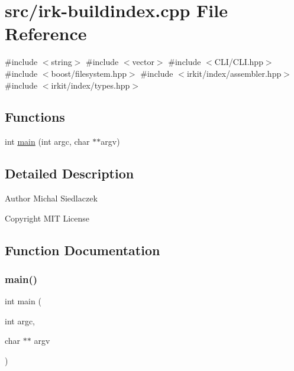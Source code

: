 \hypertarget{irk-buildindex_8cpp}{}\section{src/irk-\/buildindex.cpp File Reference}
\label{irk-buildindex_8cpp}
{\ttfamily \#include $<$string$>$}\newline
{\ttfamily \#include $<$vector$>$}\newline
{\ttfamily \#include $<$C\+L\+I/\+C\+L\+I.\+hpp$>$}\newline
{\ttfamily \#include $<$boost/filesystem.\+hpp$>$}\newline
{\ttfamily \#include $<$irkit/index/assembler.\+hpp$>$}\newline
{\ttfamily \#include $<$irkit/index/types.\+hpp$>$}\newline
\subsection*{Functions}
\begin{DoxyCompactItemize}
\item 
int \mbox{\hyperlink{irk-buildindex_8cpp_a3c04138a5bfe5d72780bb7e82a18e627}{main}} (int argc, char $\ast$$\ast$argv)
\end{DoxyCompactItemize}


\subsection{Detailed Description}
\begin{DoxyAuthor}{Author}
Michal Siedlaczek 
\end{DoxyAuthor}
\begin{DoxyCopyright}{Copyright}
M\+IT License 
\end{DoxyCopyright}


\subsection{Function Documentation}
\mbox{\label{irk-buildindex_8cpp_a3c04138a5bfe5d72780bb7e82a18e627}} 
\subsubsection{\texorpdfstring{main()}{main()}}
{\footnotesize\ttfamily int main (\begin{DoxyParamCaption}\item[{int}]{argc,  }\item[{char $\ast$$\ast$}]{argv }\end{DoxyParamCaption})}

